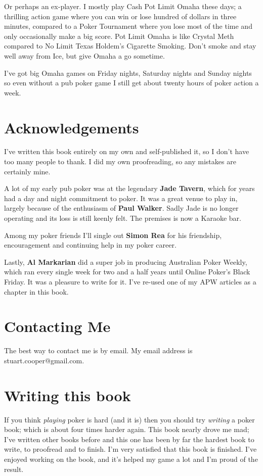 Or perhaps an ex-player. I mostly play Cash Pot Limit Omaha these days;
a thrilling action game where you can win or lose hundred of dollars
in three minutes, compared to a Poker Tournament where you lose most of
the time and only occasionally make a big score. Pot Limit Omaha
is like Crystal Meth compared to No Limit Texas Holdem's Cigarette
Smoking. Don't smoke and stay well away from Ice, but give Omaha a go
sometime.

I've got big Omaha games on Friday nights, Saturday nights and Sunday
nights so even without a pub poker game I still get about twenty hours
of poker action a week.


\section*{Acknowledgements}

I've written this book entirely on my own and self-published it, so I don't
have too many people to thank. I did my own proofreading, so any mistakes
are certainly mine.

A lot of my early pub poker was at the legendary \textbf{Jade Tavern},
which for years had a day and night commitment to poker.
It was a great venue to play in, largely because of the enthusiasm
of \textbf{Paul Walker}. Sadly Jade is no longer operating and
its loss is still keenly felt. The premises is now a Karaoke bar.

Among my poker friends I'll single out \textbf{Simon Rea} for his friendship,
encouragement and continuing help in my poker career.

Lastly, \textbf{Al Markarian} did a super job in producing Australian
Poker Weekly, which ran every single week for two and a half years
until Online Poker's Black Friday. It was a pleasure to write for
it. I've re-used one of my APW articles as a chapter in this book.

\section*{Contacting Me}

The best way to contact me is by email. My email address
is stuart.cooper@gmail.com.

\section*{Writing this book}

If you think \textit{playing} poker is hard (and it is) then you should try
\textit{writing} a poker book; which is about four times harder
again. This book nearly drove me mad; I've written other books before
and this one has been by far the hardest book to write, to proofread
and to finish. I'm very satisfied that this book is finished. I've
enjoyed working on the book, and it's helped my game a lot and I'm
proud of the result.

